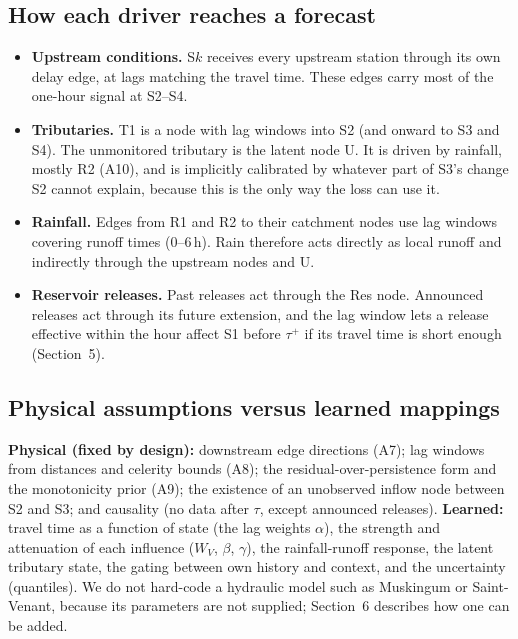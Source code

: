 \subsection*{How each driver reaches a forecast}
\begin{itemize}[leftmargin=*,itemsep=1pt]
\item \textbf{Upstream conditions.} S$k$ receives every upstream station through its own delay edge,
at lags matching the travel time. These edges carry most of the one-hour signal at S2--S4.
\item \textbf{Tributaries.} T1 is a node with lag windows into S2 (and onward to S3 and S4). The
unmonitored tributary is the latent node U. It is driven by rainfall, mostly R2 (A10), and is
implicitly calibrated by whatever part of S3's change S2 cannot explain, because this is the only
way the loss can use it.
\item \textbf{Rainfall.} Edges from R1 and R2 to their catchment nodes use lag windows covering
runoff times (0--6\,h). Rain therefore acts directly as local runoff and indirectly through the
upstream nodes and U.
\item \textbf{Reservoir releases.} Past releases act through the Res node. Announced releases act
through its future extension, and the lag window lets a release effective within the hour affect S1
before $\tau^{+}$ if its travel time is short enough (Section~5).
\end{itemize}

\subsection*{Physical assumptions versus learned mappings}
\textbf{Physical (fixed by design):} downstream edge directions (A7); lag windows from distances and
celerity bounds (A8); the residual-over-persistence form and the monotonicity prior (A9); the
existence of an unobserved inflow node between S2 and S3; and causality (no data after $\tau$, except
announced releases). \textbf{Learned:} travel time as a function of state (the lag weights $\alpha$), the
strength and attenuation of each influence ($W_V$, $\beta$, $\gamma$), the rainfall-runoff response,
the latent tributary state, the gating between own history and context, and the uncertainty
(quantiles). We do not hard-code a hydraulic model such as Muskingum or Saint-Venant, because its
parameters are not supplied; Section~6 describes how one can be added.

